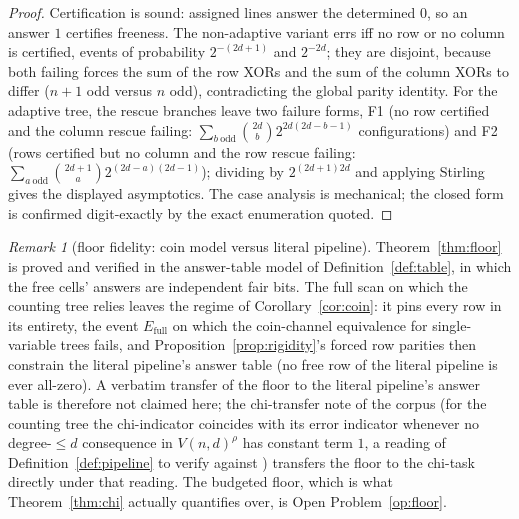 \documentclass[11pt]{article}
\theoremstyle{definition}
\theoremstyle{remark}
\newtheorem{remark}[theorem]{Remark}
\begin{document}
\begin{proof}
Certification is sound: assigned lines answer the determined $0$, so
an answer $1$ certifies freeness.  The non-adaptive variant errs iff
no row or no column is certified, events of probability $2^{-(2d+1)}$
and $2^{-2d}$; they are disjoint, because both failing forces the sum
of the row XORs and the sum of the column XORs to differ ($n+1$ odd
versus $n$ odd), contradicting the global parity identity.  For the
adaptive tree, the rescue branches leave two failure forms, F1 (no row
certified and the column rescue failing:
$\sum_{b\ \mathrm{odd}}\binom{2d}{b}2^{2d(2d-b-1)}$ configurations) and
F2 (rows certified but no column and the row rescue failing:
$\sum_{a\ \mathrm{odd}}\binom{2d+1}{a}2^{(2d-a)(2d-1)}$); dividing by
$2^{(2d+1)2d}$ and applying Stirling gives the displayed asymptotics.
The case analysis is mechanical; the closed form is confirmed
digit-exactly by the exact enumeration quoted.
\end{proof}

\begin{remark}[floor fidelity: coin model versus literal pipeline]
\label{rem:floorfidelity}
Theorem~\ref{thm:floor} is proved and verified in the answer-table
model of Definition~\ref{def:table}, in which the free cells' answers
are independent fair bits.  The full scan on which the counting tree
relies leaves the regime of Corollary~\ref{cor:coin}: it pins every
row in its entirety, the event $E_{\mathrm{full}}$ on which the
coin-channel equivalence for single-variable trees fails, and
Proposition~\ref{prop:rigidity}'s forced row parities then constrain
the literal pipeline's answer table (no free row of the literal
pipeline is ever all-zero).  A verbatim transfer of the floor to the
literal pipeline's answer table is therefore not claimed here; the
chi-transfer note of the corpus (for the counting tree the
chi-indicator coincides with its error indicator whenever no
degree-$\le d$ consequence in $V(n,d)^{\rho}$ has constant term $1$, a
reading of Definition~\ref{def:pipeline} to verify against
\cite{Kra26}) transfers the floor to the chi-task directly under that
reading.  The budgeted floor, which is what
Theorem~\ref{thm:chi} actually quantifies over, is
Open Problem~\ref{op:floor}.
\end{remark}
\end{document}
